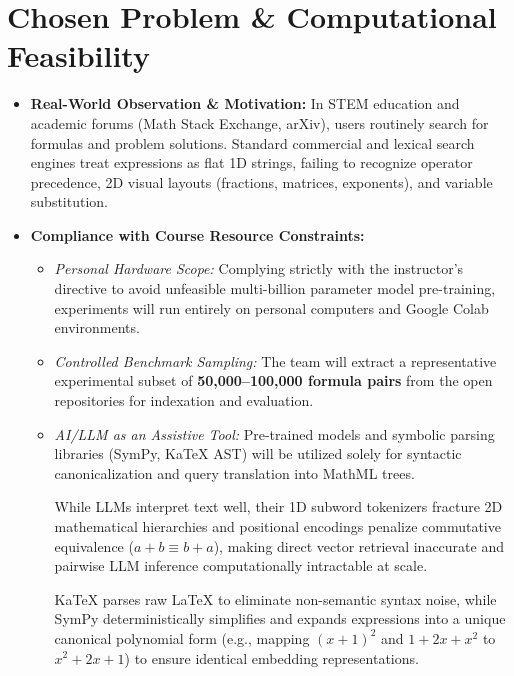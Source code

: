 \documentclass[11pt,a4paper]{article}
\begin{document}
\section{Chosen Problem \& Computational Feasibility}
\begin{itemize}
	\item \textbf{Real-World Observation \& Motivation:} In STEM education and academic forums (Math Stack Exchange, arXiv), users routinely search for formulas and problem solutions. Standard commercial and lexical search engines treat expressions as flat 1D strings, failing to recognize operator precedence, 2D visual layouts (fractions, matrices, exponents), and variable substitution.
	\item \textbf{Compliance with Course Resource Constraints:}
	\begin{itemize}
		\item \textit{Personal Hardware Scope:} Complying strictly with the instructor's directive to avoid unfeasible multi-billion parameter model pre-training, experiments will run entirely on personal computers and Google Colab environments.
		\item \textit{Controlled Benchmark Sampling:} The team will extract a representative experimental subset of \textbf{50,000--100,000 formula pairs} from the open repositories for indexation and evaluation.
		\item \textit{AI/LLM as an Assistive Tool:} Pre-trained models and symbolic parsing libraries (SymPy, KaTeX AST) will be utilized solely for syntactic canonicalization and query translation into MathML trees.
		
		While LLMs interpret text well, their 1D subword tokenizers fracture 2D mathematical hierarchies and positional encodings penalize commutative equivalence ($a+b \equiv b+a$), making direct vector retrieval inaccurate and pairwise LLM inference computationally intractable at scale.
		
		KaTeX parses raw \LaTeX{} to eliminate non-semantic syntax noise, while SymPy deterministically simplifies and expands expressions into a unique canonical polynomial form (e.g., mapping $(x+1)^2$ and $1+2x+x^2$ to $x^2+2x+1$) to ensure identical embedding representations.
			
	\end{itemize}
\end{itemize}

\end{document}
